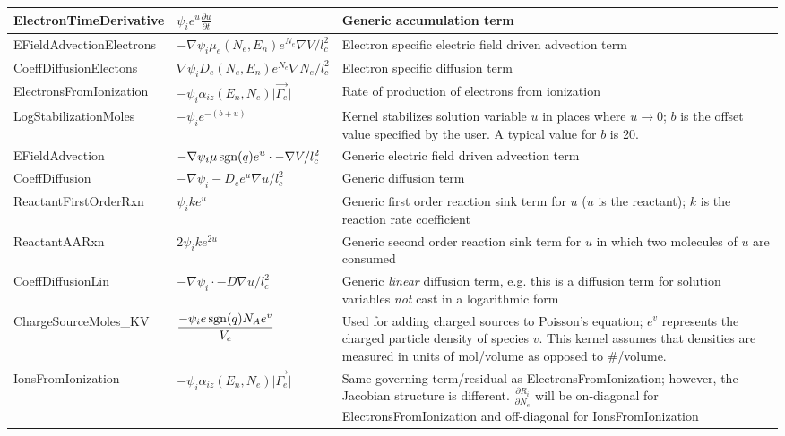 \begin{ThreePartTable}
\begin{longtable}{>{\centering}m{2.25in}| >{\centering}m{1.75in}| >{\raggedright\arraybackslash}m{2in}}
    ElectronTimeDerivative & \(\displaystyle \psi_i e^u\frac{\partial u}{\partial t}\) & Generic accumulation term\\\hline
    EFieldAdvectionElectrons & \(\displaystyle -\nabla\psi_i \mu_e(N_e,E_n) e^{N_e}\nabla V /l_c^2\) & Electron specific electric field driven advection term\\\hline
    CoeffDiffusionElectons & \(\displaystyle \nabla\psi_i D_e(N_e,E_n) e^{N_e} \nabla N_e /l_c^2\) & Electron specific diffusion term\\\hline
    ElectronsFromIonization & \(\displaystyle -\psi_i \alpha_{iz}(E_n,N_e) \lvert\vec{\Gamma_e}\rvert\) & Rate of production of electrons from ionization\\\hline
    LogStabilizationMoles & \(\displaystyle -\psi_i e^{-(b+u)}\) & Kernel stabilizes solution variable $u$ in places where $u\rightarrow 0$; $b$ is the offset value specified by the user. A typical value for $b$ is 20.\\\hline
    EFieldAdvection & \(\displaystyle -\nabla \psi_i \mu\operatorname{sgn}(q) e^u \cdot -\nabla V /l_c^2\) & Generic electric field driven advection term\\\hline
    CoeffDiffusion & \(\displaystyle -\nabla \psi_i -D_e e^u \nabla u /l_c^2\) & Generic diffusion term\\\hline
    ReactantFirstOrderRxn & \(\displaystyle \psi_i k e^u\) & Generic first order reaction sink term for $u$ ($u$ is the reactant); $k$ is the reaction rate coefficient\\\hline
    ReactantAARxn & \(\displaystyle 2 \psi_i k e^{2u}\) & Generic second order reaction sink term for $u$ in which two molecules of $u$ are consumed\\\hline
    CoeffDiffusionLin & \(\displaystyle -\nabla \psi_i \cdot -D \nabla u /l_c^2\) & Generic \textit{linear} diffusion term, e.g. this is a diffusion term for solution variables \textit{not} cast in a logarithmic form\\\hline
    ChargeSourceMoles\_KV & \(\displaystyle \frac{-\psi_i e \operatorname{sgn}(q) N_A e^v}{V_c}\) & Used for adding charged sources to Poisson's equation; $e^v$ represents the charged particle density of species $v$. This kernel assumes that densities are measured in units of mol/volume as opposed to \#/volume.\\\hline
    IonsFromIonization & \(\displaystyle -\psi_i \alpha_{iz}(E_n,N_e) \lvert\vec{\Gamma_e}\rvert\) & Same governing term/residual as ElectronsFromIonization; however, the Jacobian structure is different. $\frac{\partial R_i}{\partial N_e}$ will be on-diagonal for ElectronsFromIonization and off-diagonal for IonsFromIonization\\\hline

\end{longtable}
\end{ThreePartTable}
